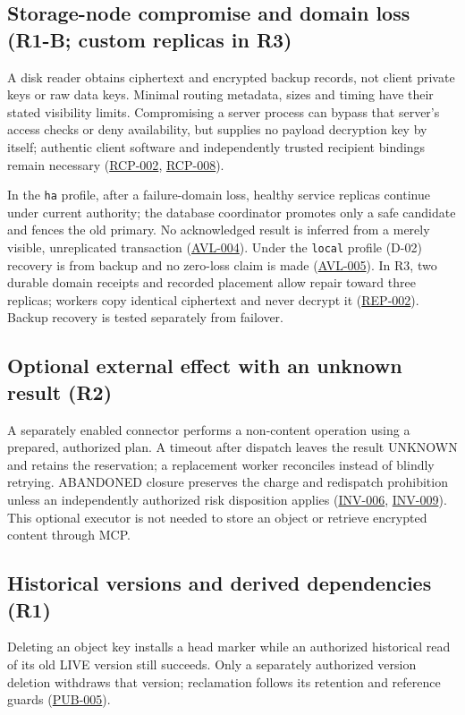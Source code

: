 \documentclass[11pt,a4paper]{article}
\newcommand{\code}[1]{{\small\nolinkurl{#1}}}
\newcommand{\rr}[1]{\hyperlink{req:#1}{#1}}
\begin{document}
\subsection{Storage-node compromise and domain loss (R1-B; custom replicas in R3)}
A disk reader obtains ciphertext and encrypted backup records, not client private keys or raw data keys. Minimal routing metadata, sizes and timing have their stated visibility limits. Compromising a server process can bypass that server's access checks or deny availability, but supplies no payload decryption key by itself; authentic client software and independently trusted recipient bindings remain necessary (\rr{RCP-002}, \rr{RCP-008}).

In the \code{ha} profile, after a failure-domain loss, healthy service replicas continue under current authority; the database coordinator promotes only a safe candidate and fences the old primary. No acknowledged result is inferred from a merely visible, unreplicated transaction (\rr{AVL-004}). Under the \code{local} profile (D-02) recovery is from backup and no zero-loss claim is made (\rr{AVL-005}). In R3, two durable domain receipts and recorded placement allow repair toward three replicas; workers copy identical ciphertext and never decrypt it (\rr{REP-002}). Backup recovery is tested separately from failover.

\subsection{Optional external effect with an unknown result (R2)}
A separately enabled connector performs a non-content operation using a prepared, authorized plan. A timeout after dispatch leaves the result UNKNOWN and retains the reservation; a replacement worker reconciles instead of blindly retrying. ABANDONED closure preserves the charge and redispatch prohibition unless an independently authorized risk disposition applies (\rr{INV-006}, \rr{INV-009}). This optional executor is not needed to store an object or retrieve encrypted content through MCP.

\subsection{Historical versions and derived dependencies (R1)}
Deleting an object key installs a head marker while an authorized historical read of its old LIVE version still succeeds. Only a separately authorized version deletion withdraws that version; reclamation follows its retention and reference guards (\rr{PUB-005}).
\end{document}
